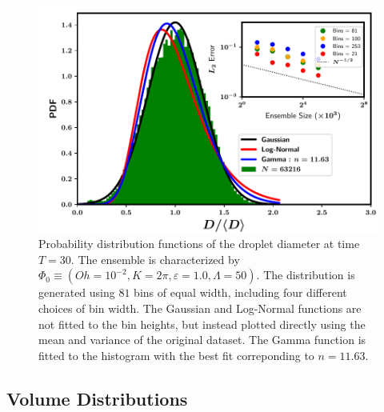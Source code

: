 \begin{figure}
\centering
\includegraphics{plots/drop_stats/long_time_diameter_fits.pdf}
\caption{Probability distribution functions of the droplet diameter at time $T = 30$. 
The ensemble is characterized by $\Phi_0 \equiv \left( Oh = 10^{-2}, K = 2\pi , \varepsilon = 1.0 , \Lambda = 50 \right)$. The distribution is generated using $81$ bins of equal width, including four different choices of bin width. The Gaussian and Log-Normal functions are not fitted to the bin heights, but instead plotted directly using the mean and variance of the original dataset. The Gamma function is fitted to the histogram with the best fit correponding to $n = 11.63$.  }
\label{t2_dia_fits}
\end{figure}



\subsection*{Volume Distributions}



